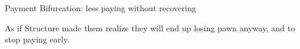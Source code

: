 \documentclass[9pt, aspectratio=169]{beamer}
\begin{document}
\begin{frame}{Payment Bifurcation: less paying without recovering}
\begin{table}[H]
\begin{center}
\footnotesize{}
\end{center}
\end{table}

   \vfill \item   %
   As if Structure made them realize they will end up losing pawn anyway, and to stop paying early.
\end{frame}


\end{document}
